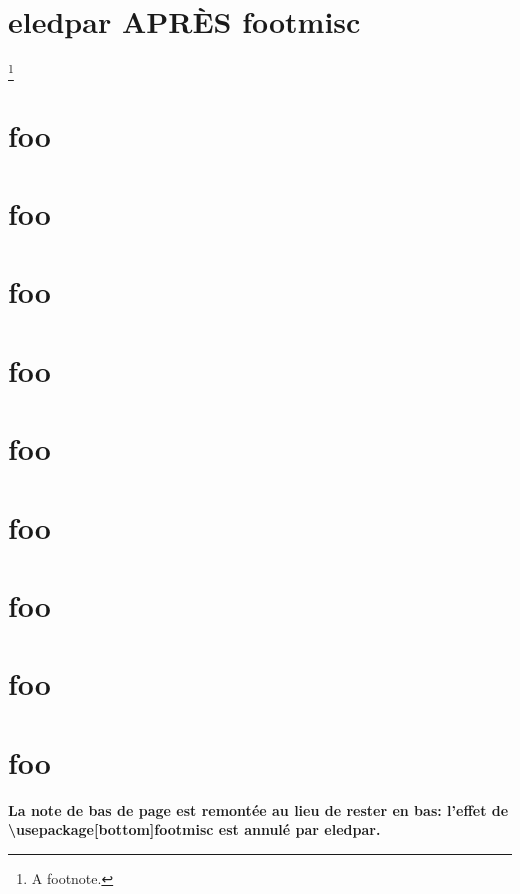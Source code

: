 \documentclass{book}
\begin{document}
\section{eledpar APRÈS footmisc}

\kant[1-3]


  \beginnumbering
  \pstart\kant[2]\footnote{A footnote.}\kant[3]\pend
  \endnumbering


\section{foo}
\section{foo}
\section{foo}
\section{foo}
\section{foo}
\section{foo}
\section{foo}
\section{foo}
\section{foo}

\bigskip

\Large\bf La note de bas de page est remontée au lieu de rester en bas: l’effet
de \textbackslash{}usepackage[bottom]{footmisc} est annulé par eledpar.
\end{document}
